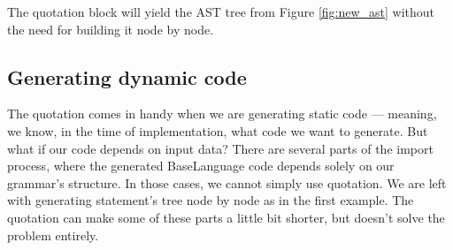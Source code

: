 The quotation block will yield the AST tree from Figure \ref{fig:new_ast} without the need for building it node by node.

\subsection{Generating dynamic code}

The quotation comes in handy when we are generating static code --- meaning, we know, in the time of implementation, what code we want to generate.
But what if our code depends on input data?
There are several parts of the import process, where the generated BaseLanguage code depends solely on our grammar's structure.
In those cases, we cannot simply use quotation.
We are left with generating statement's tree node by node as in the first example.
The quotation can make some of these parts a little bit shorter, but doesn't solve the problem entirely.